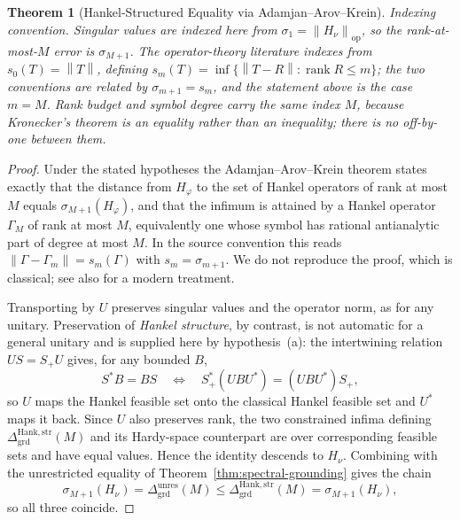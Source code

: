 \documentclass[12pt]{article}
\newtheorem{theorem}{Theorem}[section]
\theoremstyle{definition}
\DeclareMathOperator{\rank}{rank}
\newcommand{\norm}[1]{\left\lVert#1\right\rVert}
\newcommand{\Dunres}{\Delta_{\mathrm{grd}}^{\mathrm{unres}}}
\newcommand{\DHankstr}{\Delta_{\mathrm{grd}}^{\mathrm{Hank,str}}}
\begin{document}
\begin{theorem}[Hankel-Structured Equality via Adamjan--Arov--Krein]
\emph{Indexing convention.}  Singular values are indexed here from
$\sigma_1=\norm{H_\nu}_{\mathrm{op}}$, so the rank-at-most-$M$ error is
$\sigma_{M+1}$.  The operator-theory literature indexes from
$s_0(T)=\norm{T}$, defining $s_m(T)=\inf\{\norm{T-R}:\rank R\le m\}$; the two
conventions are related by $\sigma_{m+1}=s_m$, and the statement above is the
case $m=M$.  Rank budget and symbol degree carry the \emph{same} index $M$,
because Kronecker's theorem is an equality rather than an inequality; there is
no off-by-one between them.
\end{theorem}

\begin{proof}
Under the stated hypotheses the Adamjan--Arov--Krein theorem
\cite{aak1971} states exactly that the distance from $H_\varphi$ to the set of
Hankel operators of rank at most $M$ equals $\sigma_{M+1}(H_\varphi)$, and that
the infimum is attained by a Hankel operator $\Gamma_M$ of rank at most $M$,
equivalently one whose symbol has rational antianalytic part of degree at most
$M$.  In the source convention this reads $\norm{\Gamma-\Gamma_m}=s_m(\Gamma)$
with $s_m=\sigma_{m+1}$.  We do not reproduce the proof, which is classical;
see also \cite{peller2003} for a modern treatment.

Transporting by $U$ preserves singular values and the operator norm, as for
any unitary.  Preservation of \emph{Hankel structure}, by contrast, is not
automatic for a general unitary and is supplied here by hypothesis~(a): the
intertwining relation $US=S_+U$ gives, for any bounded $B$,
\[
S^{*}B=BS
\quad\Longleftrightarrow\quad
S_+^{*}(UBU^{*})=(UBU^{*})S_+,
\]
so $U$ maps the Hankel feasible set onto the classical Hankel feasible set and
$U^{*}$ maps it back.  Since $U$ also preserves rank, the two constrained
infima defining $\DHankstr(M)$ and its Hardy-space counterpart are over
corresponding feasible sets and have equal values.  Hence the identity
descends to $H_\nu$.
Combining with the unrestricted equality of
Theorem~\ref{thm:spectral-grounding} gives the chain
\[
\sigma_{M+1}(H_\nu)
=
\Dunres(M)
\le
\DHankstr(M)
=
\sigma_{M+1}(H_\nu),
\]
so all three coincide.
\end{proof}
\end{document}
